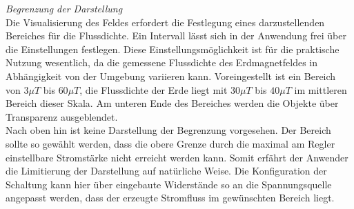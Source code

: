 \textit{Begrenzung der Darstellung}\\
Die Visualisierung des Feldes erfordert die Festlegung eines darzustellenden Bereiches für die Flussdichte. Ein Intervall lässt sich in der Anwendung frei über die Einstellungen festlegen. Diese Einstellungsmöglichkeit ist für die praktische Nutzung wesentlich, da die gemessene Flussdichte des Erdmagnetfeldes in Abhängigkeit von der Umgebung variieren kann. Voreingestellt ist ein Bereich von $3\mu T$ bis $60\mu T$, die Flussdichte der Erde liegt mit $30 \mu T$ bis $40 \mu T$ im mittleren Bereich dieser Skala. Am unteren Ende des Bereiches werden die Objekte über Transparenz ausgeblendet.\\

Nach oben hin ist keine Darstellung der Begrenzung vorgesehen. Der Bereich sollte so gewählt werden, dass die obere Grenze durch die maximal am Regler einstellbare Stromstärke nicht erreicht werden kann. Somit erfährt der Anwender die Limitierung der Darstellung auf natürliche Weise. Die Konfiguration der Schaltung kann hier über eingebaute Widerstände so an die Spannungsquelle angepasst werden, dass der erzeugte Stromfluss im gewünschten Bereich liegt.\\

